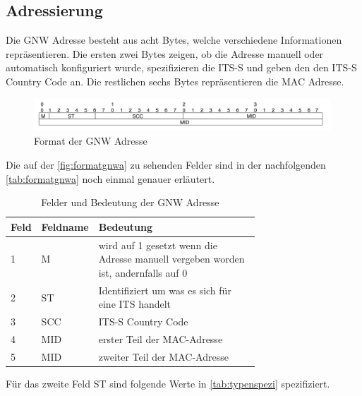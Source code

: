 \subsection{Adressierung} 
Die \acl{GNW} Adresse besteht aus acht Bytes, welche verschiedene Informationen repräsentieren. Die ersten zwei Bytes zeigen, ob die Adresse manuell oder automatisch konfiguriert wurde, spezifizieren die \ac{ITS-S} und geben den den ITS-S Country Code an. Die restlichen sechs Bytes repräsentieren die MAC Adresse.\cite{etsi302636-4-1}

\begin{figure}
	\includegraphics[width=0.99\textwidth]{content/images/03_networklayer/gnwadress.jpg}
	\caption{Format der \acl{GNW} Adresse}
	\label{fig:formatgnwa}
\end{figure}
Die auf der \autoref{fig:formatgnwa} zu sehenden Felder sind in der nachfolgenden \autoref{tab:formatgnwa} noch einmal genauer erläutert.

\begin{table}[h]
\begin{tabular}{llp{0.7\linewidth}}
\textbf{Feld} & \textbf{Feldname} & \textbf{Bedeutung} \\ \hline
    1 & M       & wird auf 1 gesetzt wenn die Adresse manuell vergeben worden ist, andernfalls auf 0          \\
    2 & ST    & Identifiziert um was es sich für eine ITS handelt       \\
    3 & SCC   &   ITS-S Country Code        \\
    4 & MID    &    erster Teil der MAC-Adresse       \\
    5 & MID     &   zweiter Teil der MAC-Adresse        \\
\end{tabular}
\caption{Felder und Bedeutung der \acs{GNW} Adresse \cite{etsi302636-4-1}}
\label{tab:formatgnwa}
\end{table}

Für das zweite Feld ST sind folgende Werte in \autoref{tab:typenspezi} spezifiziert.

